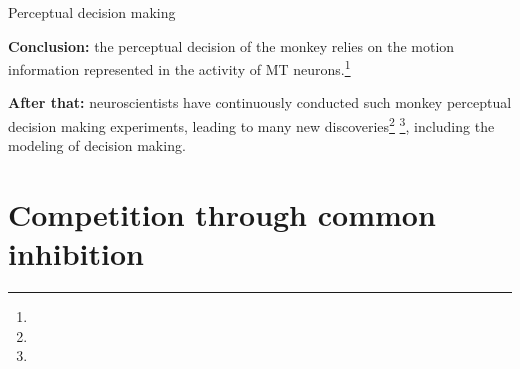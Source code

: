 \documentclass[xcolor=table,dvipsnames,svgnames,aspectratio=169,fontset=fandol]{ctexbeamer}
\begin{document}
\begin{frame}{Perceptual decision making}

  \textbf{Conclusion:} the perceptual decision of the monkey relies on the motion information represented in the activity of MT neurons.\footnote{} 

  \vskip 12pt

  \textbf{After that:} neuroscientists have continuously conducted such monkey perceptual decision making experiments, leading to many new discoveries\footnote{} \footnote{}, including the modeling of decision making.

\end{frame}

\section{Competition through common inhibition}
\end{document}
